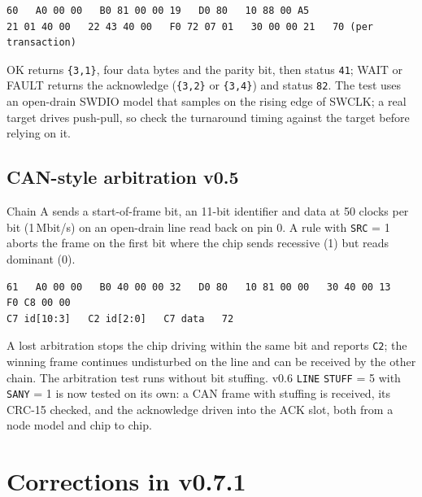 \documentclass[11pt,a4paper]{article}
\newcommand{\vfive}{\textcolor{fivec}{\textsf{\small v0.5}}}
\newcommand{\vsix}{\textcolor{sixc}{\textsf{\small v0.6}}}
\newcommand{\sig}[1]{\texttt{#1}}
\begin{document}
\begin{lstlisting}
60   A0 00 00   B0 81 00 00 19   D0 80   10 88 00 A5
21 01 40 00   22 43 40 00   F0 72 07 01   30 00 00 21   70 (per transaction)
\end{lstlisting}

OK returns \texttt{\{3,1\}}, four data bytes and the parity bit, then status \texttt{41}; WAIT or FAULT returns the acknowledge (\texttt{\{3,2\}} or \texttt{\{3,4\}}) and status \texttt{82}. The test uses an open-drain SWDIO model that samples on the rising edge of SWCLK; a real target drives push-pull, so check the turnaround timing against the target before relying on it.

\subsection{CAN-style arbitration \vfive}

Chain A sends a start-of-frame bit, an 11-bit identifier and data at 50 clocks per bit (1\,Mbit/s) on an open-drain line read back on pin 0. A rule with \sig{SRC} = 1 aborts the frame on the first bit where the chip sends recessive (1) but reads dominant (0).

\begin{lstlisting}
61   A0 00 00   B0 40 00 00 32   D0 80   10 81 00 00   30 40 00 13   F0 C8 00 00
C7 id[10:3]   C2 id[2:0]   C7 data   72
\end{lstlisting}

A lost arbitration stops the chip driving within the same bit and reports \texttt{C2}; the winning frame continues undisturbed on the line and can be received by the other chain. The arbitration test runs without bit stuffing. \vsix{} \sig{LINE} \sig{STUFF} = 5 with \sig{SANY} = 1 is now tested on its own: a CAN frame with stuffing is received, its CRC-15 checked, and the acknowledge driven into the ACK slot, both from a node model and chip to chip.

\section{Corrections in v0.7.1}
\end{document}
